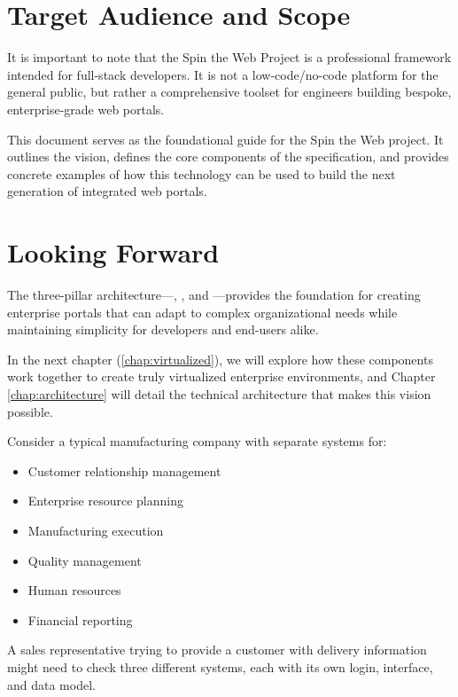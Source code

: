 \section{Target Audience and Scope}
\label{sec:target-audience}

It is important to note that the Spin the Web Project is a professional framework intended for full-stack developers. It is not a low-code/no-code platform for the general public, but rather a comprehensive toolset for engineers building bespoke, enterprise-grade web portals.

This document serves as the foundational guide for the Spin the Web project. It outlines the vision, defines the core components of the \wbdl{} specification, and provides concrete examples of how this technology can be used to build the next generation of integrated web portals.

\section{Looking Forward}
\label{sec:looking-forward}

The three-pillar architecture—\wbdl{}, \webspinner{}, and \studio{}—provides the foundation for creating enterprise portals that can adapt to complex organizational needs while maintaining simplicity for developers and end-users alike.

In the next chapter (\cref{chap:virtualized}), we will explore how these components work together to create truly virtualized enterprise environments, and Chapter \ref{chap:architecture} will detail the technical architecture that makes this vision possible.

\begin{examplebox}
Consider a typical manufacturing company with separate systems for:
\begin{itemize}
\item Customer relationship management
\item Enterprise resource planning  
\item Manufacturing execution
\item Quality management
\item Human resources
\item Financial reporting
\end{itemize}

A sales representative trying to provide a customer with delivery information might need to check three different systems, each with its own login, interface, and data model.
\end{examplebox}

